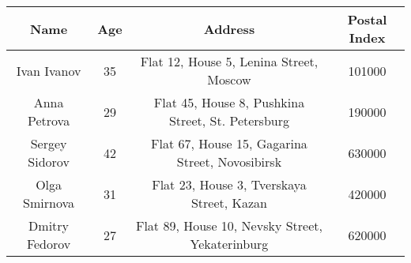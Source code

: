 \documentclass{article}
\begin{document}
\begin{tabular}{ | c | c | c | c | }
\hline
Name & Age & Address & Postal Index \\
\hline
Ivan Ivanov & 35 & Flat 12, House 5, Lenina Street, Moscow & 101000 \\
\hline
Anna Petrova & 29 & Flat 45, House 8, Pushkina Street, St. Petersburg & 190000 \\
\hline
Sergey Sidorov & 42 & Flat 67, House 15, Gagarina Street, Novosibirsk & 630000 \\
\hline
Olga Smirnova & 31 & Flat 23, House 3, Tverskaya Street, Kazan & 420000 \\
\hline
Dmitry Fedorov & 27 & Flat 89, House 10, Nevsky Street, Yekaterinburg & 620000 \\
\hline
\end{tabular}
\end{document}

